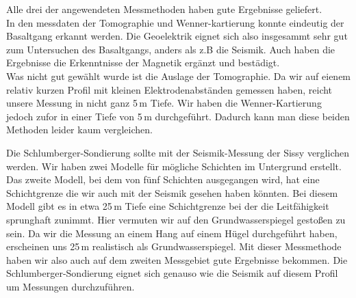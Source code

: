 
Alle drei der angewendeten Messmethoden haben gute Ergebnisse geliefert.\\
In den messdaten der Tomographie und Wenner-kartierung konnte eindeutig der Basaltgang erkannt werden. Die Geoelektrik eignet sich also insgesammt sehr gut zum Untersuchen des Basaltgangs, anders als z.B die Seismik. Auch haben die Ergebnisse die Erkenntnisse der Magnetik ergänzt und bestädigt. \\
Was nicht gut gewählt wurde ist die Auslage der Tomographie. Da wir auf eienem relativ kurzen Profil mit kleinen Elektrodenabständen gemessen haben, reicht unsere Messung in nicht ganz 5\,m Tiefe. Wir haben die Wenner-Kartierung jedoch zufor in einer Tiefe von 5\,m durchgeführt. Dadurch kann man diese beiden Methoden leider kaum vergleichen.

Die Schlumberger-Sondierung sollte mit der Seismik-Messung der Sissy verglichen werden. Wir haben zwei Modelle für mögliche Schichten im Untergrund erstellt. Das zweite Modell, bei dem von fünf Schichten ausgegangen wird, hat eine Schichtgrenze die wir auch mit der Seismik gesehen haben könnten. Bei diesem Modell gibt es in etwa 25\,m Tiefe eine Schichtgrenze bei der die Leitfähigkeit sprunghaft zunimmt. Hier vermuten  wir auf den Grundwasserspiegel gestoßen zu sein. Da wir die Messung an einem Hang auf einem Hügel durchgeführt haben, erscheinen uns 25\,m realistisch als Grundwasserspiegel. Mit dieser Messmethode haben wir also auch auf dem zweiten Messgebiet gute Ergebnisse bekommen. Die Schlumberger-Sondierung eignet sich genauso wie die Seismik auf diesem Profil um Messungen durchzuführen. 